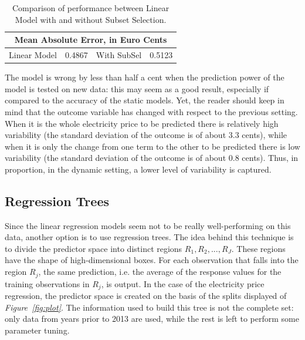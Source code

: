 \documentclass[a4paper,12pt]{book}
\begin{document}
\begin{table}[tb]
\begin{center}
\begin{tabular}{|c|c|c|c|}
\hline
\multicolumn{4}{|c|}{Mean Absolute Error, in Euro Cents}\\
\hline
Linear Model&0.4867&With SubSel&0.5123\\
\hline
\end{tabular}
\caption{Comparison of performance between Linear Model with and without Subset Selection.}
\label{Tab:euro}
\end{center}
\end{table}

The model is wrong by less than half a cent when the prediction power of the model is tested on new data: this may seem as a good result, especially if compared to the accuracy of the static models. Yet, the reader should keep in mind that the outcome variable has changed with respect to the previous setting. When it is the whole electricity price to be predicted there is relatively high variability (the standard deviation of the outcome is of about 3.3 cents), while when it is only the change from one term to the other to be predicted there is low variability (the standard deviation of the outcome is of about 0.8 cents). Thus, in proportion, in the dynamic setting, a lower level of variability is captured.

\subsection{Regression Trees}

Since the linear regression models seem not to be really well-performing on this data, another option is to use regression trees. The idea behind this technique is to divide the predictor space into distinct regions $R_1, R_2, ..., R_J$. These regions have the shape of high-dimensional boxes. For each observation that falls into the region $R_j$, the same prediction, i.e. the average of the response values for the training observations in $R_j$, is output. In the case of the electricity price regression, the predictor space is created on the basis of the splits displayed of \textit{Figure~\ref{fig:plot}}. The information used to build this tree is not the complete set: only data from years prior to 2013 are used, while the rest is left to perform some parameter tuning.
\end{document}
